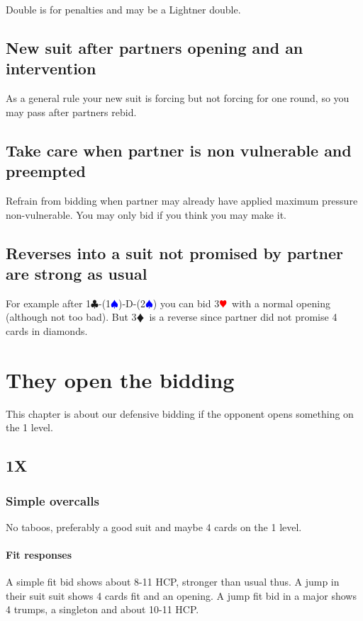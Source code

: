 \documentclass[a4paper]{article}
\newcommand{\BC}{\textcolor{OliveGreen}{$\clubsuit$}}
\newcommand{\BD}{\textcolor{RedOrange}{$\vardiamondsuit$}}
\newcommand{\BH}{\textcolor{Red}{$\varheartsuit${}}}
\newcommand{\BS}{\textcolor{Blue}{$\spadesuit${}}}
\begin{document}
Double is for penalties and may be a Lightner double.
\bigbreak
\subsection{New suit after partners opening and an intervention}

As a general rule your new suit is forcing but not forcing for one round, so
you may pass after partners rebid.
\bigbreak
\subsection{Take care when partner is non vulnerable and preempted}

Refrain from bidding when partner may already have applied maximum
pressure non-vulnerable. You may only bid if you think you may make it.
\bigbreak
\subsection{Reverses into a suit not promised by partner are strong as usual}

For example after 1\BC -(1\BS )-D-(2\BS ) you can bid 3\BH\ with a normal opening
(although not too bad). But 3\BD\ is a reverse since partner did not promise 4
cards in diamonds.
\bigbreak
\section{They open the bidding}

This chapter is about our defensive bidding if the opponent opens something on the 1 level.
\bigbreak
\subsection{1X}

\subsubsection{Simple overcalls}

No taboos, preferably a good suit and maybe 4 cards on the 1 level.
\bigbreak
\paragraph{Fit responses}

A simple fit bid shows about 8-11 HCP, stronger than usual thus.
\bigbreak
A jump in their suit suit shows 4 cards fit and an opening.
\bigbreak
A jump fit bid in a major shows 4 trumps, a singleton and about 10-11 HCP.
\bigbreak
\end{document}
